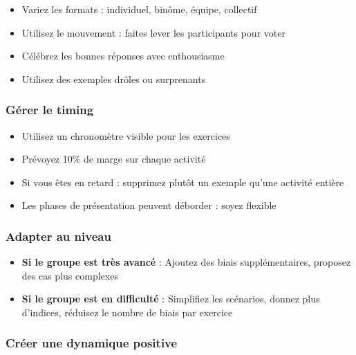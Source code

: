 \documentclass[
]{article}
\providecommand{\tightlist}{%
  \setlength{\itemsep}{0pt}\setlength{\parskip}{0pt}}
\begin{document}
\begin{itemize}
\tightlist
\item
  Variez les formats : individuel, binôme, équipe, collectif
\item
  Utilisez le mouvement : faites lever les participants pour voter
\item
  Célébrez les bonnes réponses avec enthousiasme
\item
  Utilisez des exemples drôles ou surprenants
\end{itemize}

\subsubsection{\texorpdfstring{\textbf{Gérer le
timing}}{Gérer le timing}}\label{guxe9rer-le-timing}

\begin{itemize}
\tightlist
\item
  Utilisez un chronomètre visible pour les exercices
\item
  Prévoyez 10\% de marge sur chaque activité
\item
  Si vous êtes en retard : supprimez plutôt un exemple qu'une activité
  entière
\item
  Les phases de présentation peuvent déborder : soyez flexible
\end{itemize}

\subsubsection{\texorpdfstring{\textbf{Adapter au
niveau}}{Adapter au niveau}}\label{adapter-au-niveau}

\begin{itemize}
\tightlist
\item
  \textbf{Si le groupe est très avancé} : Ajoutez des biais
  supplémentaires, proposez des cas plus complexes
\item
  \textbf{Si le groupe est en difficulté} : Simplifiez les scénarios,
  donnez plus d'indices, réduisez le nombre de biais par exercice
\end{itemize}

\subsubsection{\texorpdfstring{\textbf{Créer une dynamique
positive}}{Créer une dynamique positive}}\label{cruxe9er-une-dynamique-positive}
\end{document}
